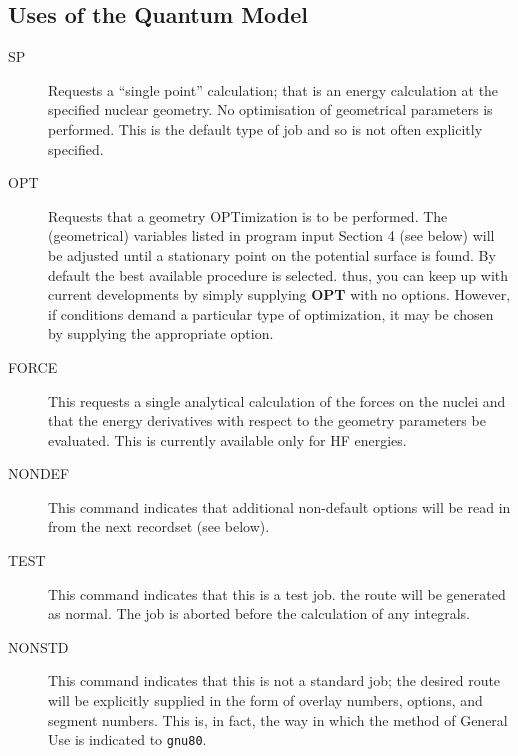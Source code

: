 \subsection{\sf Uses of the Quantum Model}
\begin{description}
\item[SP] Requests a ``single point'' calculation; that is
an energy calculation at the specified nuclear geometry.
No optimisation of geometrical parameters is performed. 
This is the default type of job
and so is not often explicitly specified.
\item[OPT]  Requests that a geometry OPTimization is to be performed. 
The (geometrical)
variables listed in program input Section 4 (see below) will be
adjusted until a stationary point on the potential surface is
found. By default the best available procedure is selected.
thus, you can keep up with current developments by simply
supplying {\bf OPT} with no options. However, if conditions demand
a particular type of optimization, it may be chosen by
supplying the appropriate option.
\item[FORCE]  This requests a single analytical calculation of the forces on
the nuclei and that the energy derivatives with respect to the
geometry parameters be evaluated. This is currently available
only for HF energies.
\item[NONDEF]  This command indicates that additional non-default options will
be read in from the next recordset (see below).
\item[TEST]    This command indicates that this is a test job. the route will
be generated as normal. The job is aborted before the calculation of
any integrals.
\item[NONSTD]    This command indicates that this is not a standard job;
the desired route will be explicitly supplied in the form of
overlay numbers, options, and segment numbers. This is, in fact,
the way in which the method of General Use is indicated to {\tt gnu80}.
\end{description}
